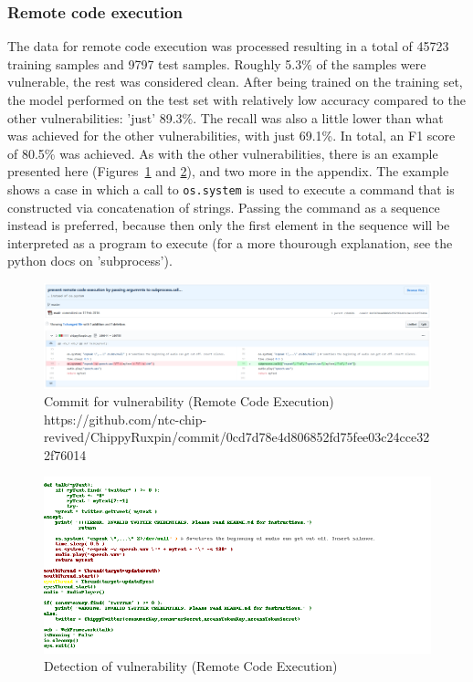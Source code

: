 \documentclass[
a4paper,
pagesize,
pdftex,
12pt,
twoside, %
BCOR=5mm, %
ngerman,
fleqn,
final,
]{scrartcl}
\begin{document}
	\subsubsection{Remote code execution}
	The data for remote code execution was processed resulting in a total of 45723 training samples and 9797 test samples. Roughly 5.3\% of the samples were vulnerable, the rest was considered clean. After being trained on the training set, the model performed on the test set with relatively low accuracy compared to the other vulnerabilities: 'just' 89.3\%. The recall was also a little lower than what was achieved for the other vulnerabilities, with just 69.1\%. In total, an F1 score of 80.5\% was achieved. As with the other vulnerabilities, there is an example presented here (Figures~\ref{fig:remote_code_executionB} and \ref{fig:remote_code_executionBr}), and two more in the appendix. The example shows a case in which a call to \texttt{os.system} is used to execute a command that is constructed via concatenation of strings. Passing the command as a sequence instead is preferred, because then only the first element in the sequence will be interpreted as a program to execute (for a more thourough explanation, see the python docs on 'subprocess').

	\begin{figure}[H]
		\centering
		\includegraphics[width=\linewidth]{Images/remote_code_executionB}
		\caption{Commit for vulnerability (Remote Code Execution) \newline \scriptsize{https://github.com/ntc-chip-revived/ChippyRuxpin/commit/0cd7d78e4d806852fd75fee03c24cce322f76014}}
		\label{fig:remote_code_executionB}
	\end{figure}
	\begin{figure}[H]
		\centering
		\includegraphics[width=\linewidth]{Images/remote_code_executionBr}
		\caption{Detection of vulnerability (Remote Code Execution)}
		\label{fig:remote_code_executionBr}
	\end{figure}
	
\end{document}
